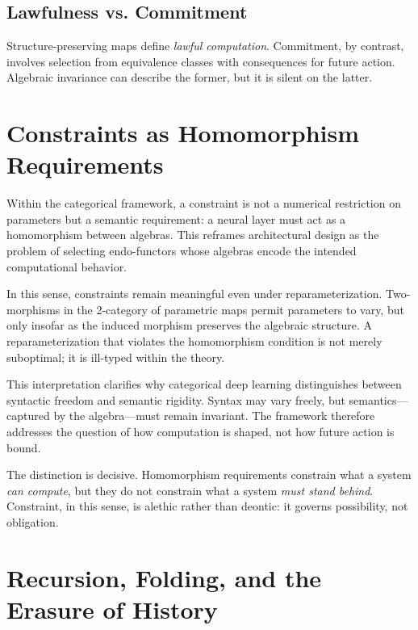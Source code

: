 \documentclass[11pt]{article}
\begin{document}
\subsection{Lawfulness vs. Commitment}

Structure-preserving maps define \emph{lawful computation}. Commitment, by
contrast, involves selection from equivalence classes with consequences for
future action. Algebraic invariance can describe the former, but it is silent on
the latter.

\section{Constraints as Homomorphism Requirements}

Within the categorical framework, a constraint is not a numerical restriction on
parameters but a semantic requirement: a neural layer must act as a homomorphism
between algebras. This reframes architectural design as the problem of selecting
endo-functors whose algebras encode the intended computational behavior.

In this sense, constraints remain meaningful even under reparameterization.
Two-morphisms in the 2-category of parametric maps permit parameters to vary, but
only insofar as the induced morphism preserves the algebraic structure. A
reparameterization that violates the homomorphism condition is not merely
suboptimal; it is ill-typed within the theory.

This interpretation clarifies why categorical deep learning distinguishes
between syntactic freedom and semantic rigidity. Syntax may vary freely, but
semantics—captured by the algebra—must remain invariant. The framework therefore
addresses the question of how computation is shaped, not how future action is
bound.

The distinction is decisive. Homomorphism requirements constrain what a system
\emph{can compute}, but they do not constrain what a system \emph{must stand
behind}. Constraint, in this sense, is alethic rather than deontic: it governs
possibility, not obligation.


\section{Recursion, Folding, and the Erasure of History}
\end{document}
